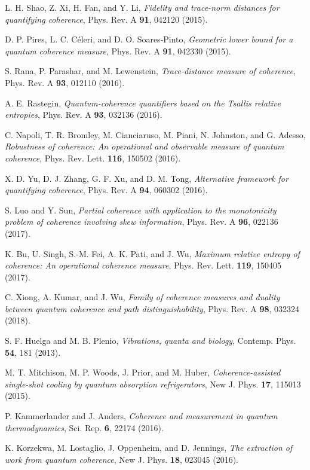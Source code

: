 \documentclass[american,aps,pra,reprint, superscriptaddress]{revtex4-1}
\theoremstyle{plain}
\theoremstyle{definition}
\theoremstyle{remark}
\begin{document}
\begin{thebibliography}{99}
 L. H. Shao, Z. Xi, H. Fan, and Y. Li, {\it Fidelity and trace-norm distances for quantifying coherence}, Phys. Rev. A {\bf 91}, 042120 (2015).

 D. P. Pires, L. C. C\'{e}leri, and D. O. Soares-Pinto, {\it Geometric lower bound for a quantum coherence measure}, Phys. Rev. A {\bf 91}, 042330 (2015).

 S. Rana, P. Parashar, and M. Lewenstein, {\it Trace-distance measure of coherence}, Phys. Rev. A {\bf 93}, 012110 (2016).

 A. E. Rastegin, {\it Quantum-coherence quantifiers based on the Tsallis relative entropies}, Phys. Rev. A {\bf 93}, 032136 (2016).

  C. Napoli, T. R. Bromley, M. Cianciaruso, M. Piani, N. Johnston, and G. Adesso, {\it Robustness of coherence: An operational and
observable measure of quantum coherence}, Phys. Rev. Lett. {\bf 116}, 150502 (2016).

 X. D. Yu, D. J. Zhang, G. F. Xu, and D. M. Tong, {\it Alternative framework for quantifying coherence}, Phys. Rev. A {\bf 94}, 060302 (2016).

 S. Luo and Y. Sun, {\it Partial coherence with application to the monotonicity problem of coherence involving skew information}, Phys. Rev. A {\bf 96}, 022136 (2017).

 K. Bu, U. Singh, S.-M. Fei, A. K. Pati, and J. Wu, {\it Maximum relative entropy of coherence: An operational coherence measure}, Phys. Rev. Lett. {\bf 119}, 150405 (2017).

 C. Xiong, A. Kumar, and J. Wu, {\it Family of coherence measures and duality between quantum coherence and path distinguishability}, Phys. Rev. A {\bf 98}, 032324 (2018).

 S. F. Huelga and M. B. Plenio, {\it Vibrations, quanta and biology}, Contemp. Phys. {\bf 54}, 181 (2013).

 M. T. Mitchison, M. P. Woods, J. Prior, and M. Huber,
{\it Coherence-assisted single-shot cooling by quantum absorption
refrigerators}, New J. Phys. {\bf 17}, 115013 (2015).

 P. Kammerlander and J. Anders, {\it Coherence and measurement
in quantum thermodynamics}, Sci. Rep. {\bf 6}, 22174 (2016).

 K. Korzekwa, M. Lostaglio, J. Oppenheim, and D. Jennings,
{\it The extraction of work from quantum coherence}, New J. Phys. {\bf 18}, 023045 (2016).


\end{thebibliography}
\end{document}
